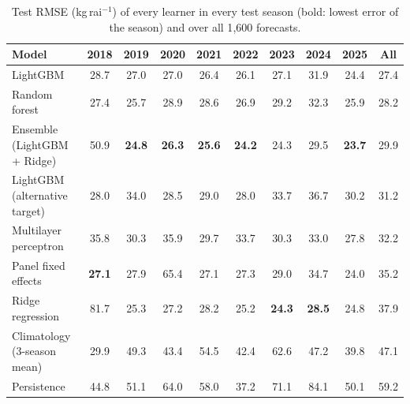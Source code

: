 \begin{table}[H]\centering\footnotesize
\caption{Test RMSE (kg\,rai$^{-1}$) of every learner in every test season (bold: lowest error of the season) and over all 1{,}600 forecasts.}\label{tab:byseason}
\begin{tabular}{@{}lccccccccc@{}}
\toprule
Model & 2018 & 2019 & 2020 & 2021 & 2022 & 2023 & 2024 & 2025 & All \\
\midrule
LightGBM & 28.7 & 27.0 & 27.0 & 26.4 & 26.1 & 27.1 & 31.9 & 24.4 & 27.4 \\
Random forest & 27.4 & 25.7 & 28.9 & 28.6 & 26.9 & 29.2 & 32.3 & 25.9 & 28.2 \\
Ensemble (LightGBM + Ridge) & 50.9 & \textbf{24.8} & \textbf{26.3} & \textbf{25.6} & \textbf{24.2} & 24.3 & 29.5 & \textbf{23.7} & 29.9 \\
LightGBM (alternative target) & 28.0 & 34.0 & 28.5 & 29.0 & 28.0 & 33.7 & 36.7 & 30.2 & 31.2 \\
Multilayer perceptron & 35.8 & 30.3 & 35.9 & 29.7 & 33.7 & 30.3 & 33.0 & 27.8 & 32.2 \\
Panel fixed effects & \textbf{27.1} & 27.9 & 65.4 & 27.1 & 27.3 & 29.0 & 34.7 & 24.0 & 35.2 \\
Ridge regression & 81.7 & 25.3 & 27.2 & 28.2 & 25.2 & \textbf{24.3} & \textbf{28.5} & 24.8 & 37.9 \\
Climatology (3-season mean) & 29.9 & 49.3 & 43.4 & 54.5 & 42.4 & 62.6 & 47.2 & 39.8 & 47.1 \\
Persistence & 44.8 & 51.1 & 64.0 & 58.0 & 37.2 & 71.1 & 84.1 & 50.1 & 59.2 \\
\bottomrule
\end{tabular}
\end{table}
